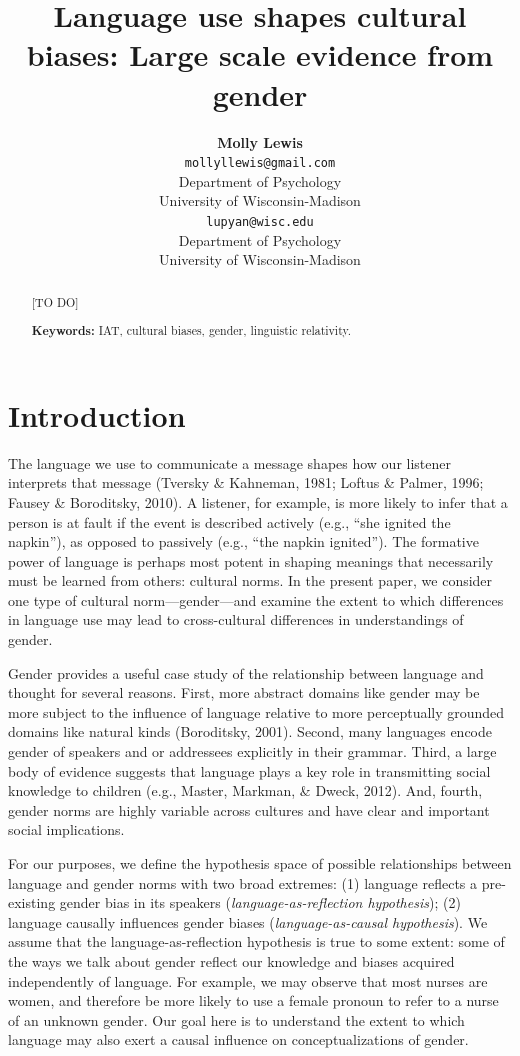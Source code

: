 \documentclass[10pt, letterpaper]{article}
\title{Language use shapes cultural biases: Large scale evidence from gender}
\author{{\large \bf Molly Lewis} \\ \texttt{mollyllewis@gmail.com} \\ Department of Psychology  \\ University of Wisconsin-Madison \And {\large \bf Gary Lupyan} \\ \texttt{lupyan@wisc.edu} \\ Department of Psychology  \\ University of Wisconsin-Madison}
\begin{document}
\maketitle

\begin{abstract}
{[}TO DO{]}

\textbf{Keywords:}
IAT, cultural biases, gender, linguistic relativity.
\end{abstract}

\section{Introduction}\label{introduction}

The language we use to communicate a message shapes how our listener
interprets that message (Tversky \& Kahneman, 1981; Loftus \& Palmer,
1996; Fausey \& Boroditsky, 2010). A listener, for example, is more
likely to infer that a person is at fault if the event is described
actively (e.g., ``she ignited the napkin''), as opposed to passively
(e.g., ``the napkin ignited''). The formative power of language is
perhaps most potent in shaping meanings that necessarily must be learned
from others: cultural norms. In the present paper, we consider one type
of cultural norm---gender---and examine the extent to which differences
in language use may lead to cross-cultural differences in understandings
of gender.

Gender provides a useful case study of the relationship between language
and thought for several reasons. First, more abstract domains like
gender may be more subject to the influence of language relative to more
perceptually grounded domains like natural kinds (Boroditsky, 2001).
Second, many languages encode gender of speakers and or addressees
explicitly in their grammar. Third, a large body of evidence suggests
that language plays a key role in transmitting social knowledge to
children (e.g., Master, Markman, \& Dweck, 2012). And, fourth, gender
norms are highly variable across cultures and have clear and important
social implications.

For our purposes, we define the hypothesis space of possible
relationships between language and gender norms with two broad extremes:
(1) language reflects a pre-existing gender bias in its speakers
(\emph{language-as-reflection hypothesis}); (2) language causally
influences gender biases (\emph{language-as-causal hypothesis}). We
assume that the language-as-reflection hypothesis is true to some
extent: some of the ways we talk about gender reflect our knowledge and
biases acquired independently of language. For example, we may observe
that most nurses are women, and therefore be more likely to use a female
pronoun to refer to a nurse of an unknown gender. Our goal here is to
understand the extent to which language may also exert a causal
influence on conceptualizations of gender.
\end{document}
